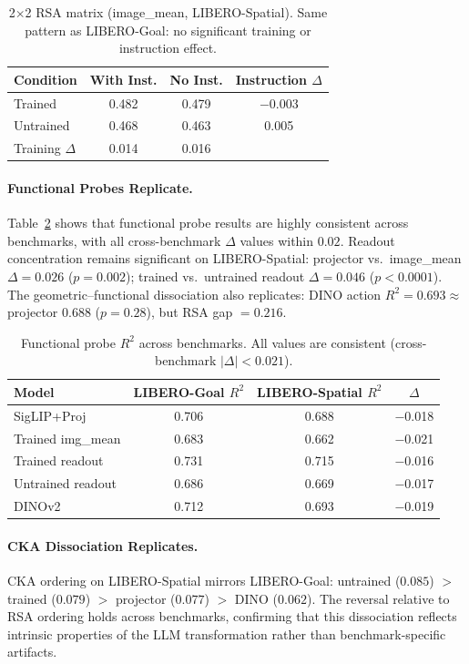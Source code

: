 \documentclass[letterpaper]{article}
\begin{document}
\begin{table}[t]
\centering
\caption{2$\times$2 RSA matrix (image\_mean, LIBERO-Spatial). Same pattern as LIBERO-Goal: no significant training or instruction effect.}
\label{tab:2x2-spatial}
\begin{tabular}{@{}lccc@{}}
\toprule
Condition & With Inst. & No Inst. & Instruction $\Delta$ \\
\midrule
Trained   & 0.482 & 0.479 & $-$0.003 \\
Untrained & 0.468 & 0.463 & 0.005 \\
\midrule
Training $\Delta$ & 0.014 & 0.016 & \\
\bottomrule
\end{tabular}
\end{table}

\paragraph{Functional Probes Replicate.}
Table~\ref{tab:cross-benchmark-probe} shows that functional probe results are highly consistent across benchmarks, with all cross-benchmark $\Delta$ values within $0.02$.
Readout concentration remains significant on LIBERO-Spatial: projector vs.\ image\_mean $\Delta{=}0.026$ ($p{=}0.002$); trained vs.\ untrained readout $\Delta{=}0.046$ ($p{<}0.0001$).
The geometric--functional dissociation also replicates: DINO action $R^2{=}0.693 \approx$ projector $0.688$ ($p{=}0.28$), but RSA gap $= 0.216$.

\begin{table}[t]
\centering
\caption{Functional probe $R^2$ across benchmarks. All values are consistent (cross-benchmark $|\Delta|<0.021$).}
\label{tab:cross-benchmark-probe}
\begin{tabular}{@{}lccc@{}}
\toprule
Model & LIBERO-Goal $R^2$ & LIBERO-Spatial $R^2$ & $\Delta$ \\
\midrule
SigLIP+Proj          & 0.706 & 0.688 & $-$0.018 \\
Trained img\_mean     & 0.683 & 0.662 & $-$0.021 \\
Trained readout      & 0.731 & 0.715 & $-$0.016 \\
Untrained readout    & 0.686 & 0.669 & $-$0.017 \\
DINOv2               & 0.712 & 0.693 & $-$0.019 \\
\bottomrule
\end{tabular}
\end{table}

\paragraph{CKA Dissociation Replicates.}
CKA ordering on LIBERO-Spatial mirrors LIBERO-Goal: untrained ($0.085$) $>$ trained ($0.079$) $>$ projector ($0.077$) $>$ DINO ($0.062$).
The reversal relative to RSA ordering holds across benchmarks, confirming that this dissociation reflects intrinsic properties of the LLM transformation rather than benchmark-specific artifacts.
\end{document}
